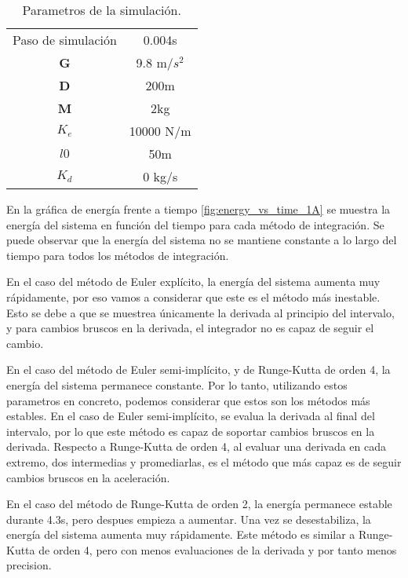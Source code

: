 \documentclass{article}
\begin{document}
\begin{table}[h]
    \centering
    \begin{tabular}{cc}
        Paso de simulación & 0.004s      \\
        \textbf{G}         & 9.8 m/$s^2$ \\
        \textbf{D}         & 200m        \\
        \textbf{M}         & 2kg         \\
        \textbf{$K_e$}     & 10000 N/m   \\
        \textbf{$l0$}      & 50m         \\
        \textbf{$K_d$}     & 0 kg/s      \\
    \end{tabular}
    \caption{Parametros de la simulación.}
    \label{tab:parametros_1}
\end{table}

En la gráfica de energía frente a tiempo \ref{fig:energy_vs_time_1A} se muestra la energía del sistema en función del tiempo para cada método de integración. Se puede observar que la energía del sistema no se mantiene constante a lo largo del tiempo para todos los métodos de integración.

En el caso del método de Euler explícito, la energía del sistema aumenta muy rápidamente, por eso vamos a considerar que este es el método más inestable. Esto se debe a que se muestrea únicamente la derivada al principio del intervalo, y para cambios bruscos en la derivada, el integrador no es capaz de seguir el cambio.

En el caso del método de Euler semi-implícito, y de Runge-Kutta de orden 4, la energía del sistema permanece constante. Por lo tanto, utilizando estos parametros en concreto, podemos considerar que estos son los métodos más estables. En el caso de Euler semi-implícito, se evalua la derivada al final del intervalo, por lo que este método es capaz de soportar cambios bruscos en la derivada. Respecto a Runge-Kutta de orden 4, al evaluar una derivada en cada extremo, dos intermedias y promediarlas, es el método que más capaz es de seguir cambios bruscos en la aceleración.

En el caso del método de Runge-Kutta de orden 2, la energía permanece estable durante 4.3s, pero despues empieza a aumentar. Una vez se desestabiliza, la energía del sistema aumenta muy rápidamente. Este método es similar a Runge-Kutta de orden 4, pero con menos evaluaciones de la derivada y por tanto menos precision.
\end{document}

